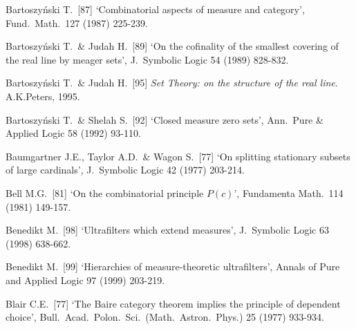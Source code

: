 {Bartoszy\'nski T.\ [87] `Combinatorial aspects of measure and category',
Fund.\ Math.\ 127 (1987) 225-239.
\cmmnt{[522S.]}




Bartoszy\'nski T.\ \& Judah H.\ [89] `On the cofinality of the smallest
covering of the real line by meager sets', J.\ Symbolic Logic 54 (1989) 828-832.
\cmmnt{[522V.]}

Bartoszy\'nski T.\ \& Judah H.\ [95] {\it Set Theory:  on the structure
of the real line}.  A.K.Peters, 1995.



Bartoszy\'nski T.\ \& Shelah S.\ [92] `Closed measure zero sets', Ann.\
Pure \& Applied Logic 58 (1992) 93-110.
\cmmnt{[526M.]}

Baumgartner J.E., Taylor A.D.\ \& Wagon S.\ [77] `On splitting
stationary subsets of large cardinals',
J.\ Symbolic Logic 42 (1977) 203-214.

Bell M.G.\ [81] `On the combinatorial principle $P(c)$',
Fundamenta Math.\ 114 (1981) 149-157.
\cmmnt{[\S517 {\it notes\/}.]}

Benedikt M.\ [98] `Ultrafilters which extend measures',
J.\ Symbolic Logic 63 (1998) 638-662.
\cmmnt{[538M, 538Xm, \S538 {\it notes\/}.]}

Benedikt M.\ [99] `Hierarchies of measure-theoretic ultrafilters',
Annals of Pure and Applied Logic 97 (1999) 203-219.
\cmmnt{[538H.]}

Blair C.E.\ [77] `The Baire category theorem implies the principle of
dependent choice', Bull.\ Acad.\ Polon.\ Sci.\ (Math.\ Astron.\ Phys.) 25
(1977) 933-934.
\cmmnt{[\S566 {\it notes\/}.]}

}
